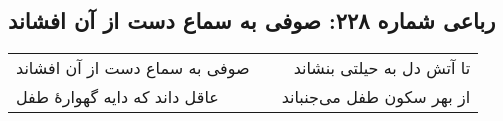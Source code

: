 \begin{center}
\section*{رباعی شماره ۲۲۸: صوفی به سماع دست از آن افشاند}
\label{sec:sh228}
\begin{longtable}{l p{0.5cm} r}
صوفی به سماع دست از آن افشاند
&&
تا آتش دل به حیلتی بنشاند
\\
عاقل داند که دایه گهوارهٔ طفل
&&
از بهر سکون طفل می‌جنباند
\\
\end{longtable}
\end{center}

